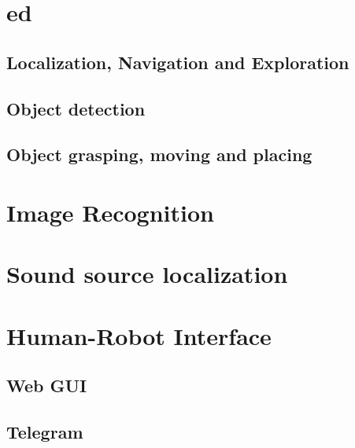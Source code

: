 \documentclass[runningheads,a4paper]{llncs}
\begin{document}
\section{\acrfull{ed}}


\subsection{Localization, Navigation and Exploration}


\subsection{Object detection}


\subsection{Object grasping, moving and placing}


\section{Image Recognition}


%

\section{Sound source localization}


%

\section{Human-Robot Interface}

\subsection{Web GUI}

\subsection{Telegram\texttrademark\hspace{0em}}

\end{document}
